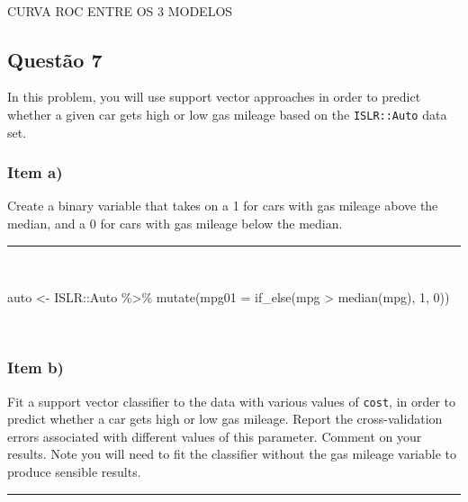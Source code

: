 \documentclass[
  a4paperpaper,
]{article}
\newenvironment{Shaded}{\begin{snugshade}}{\end{snugshade}}
\newcommand{\AttributeTok}[1]{\textcolor[rgb]{0.40,0.45,0.13}{#1}}
\newcommand{\DecValTok}[1]{\textcolor[rgb]{0.68,0.00,0.00}{#1}}
\newcommand{\FunctionTok}[1]{\textcolor[rgb]{0.28,0.35,0.67}{#1}}
\newcommand{\NormalTok}[1]{\textcolor[rgb]{0.00,0.23,0.31}{#1}}
\newcommand{\OtherTok}[1]{\textcolor[rgb]{0.00,0.23,0.31}{#1}}
\newcommand{\SpecialCharTok}[1]{\textcolor[rgb]{0.37,0.37,0.37}{#1}}
\begin{document}
~

CURVA ROC ENTRE OS 3 MODELOS

\subsection{Questão 7}\label{questuxe3o-7}

In this problem, you will use support vector approaches in order to
predict whether a given car gets high or low gas mileage based on the
\texttt{ISLR::Auto} data set.

\subsubsection{Item a)}\label{item-a-1}

Create a binary variable that takes on a 1 for cars with gas mileage
above the median, and a 0 for cars with gas mileage below the median.

\begin{center}\rule{0.5\linewidth}{0.5pt}\end{center}

~

\begin{Shaded}
\begin{Highlighting}[]
\NormalTok{auto }\OtherTok{\textless{}{-}}\NormalTok{ ISLR}\SpecialCharTok{::}\NormalTok{Auto }\SpecialCharTok{\%\textgreater{}\%}
  \FunctionTok{mutate}\NormalTok{(}\AttributeTok{mpg01 =} \FunctionTok{if\_else}\NormalTok{(mpg }\SpecialCharTok{\textgreater{}} \FunctionTok{median}\NormalTok{(mpg), }\DecValTok{1}\NormalTok{, }\DecValTok{0}\NormalTok{))}
\end{Highlighting}
\end{Shaded}

~

\subsubsection{Item b)}\label{item-b-1}

Fit a support vector classifier to the data with various values of
\texttt{cost}, in order to predict whether a car gets high or low gas
mileage. Report the cross-validation errors associated with different
values of this parameter. Comment on your results. Note you will need to
fit the classifier without the gas mileage variable to produce sensible
results.

\begin{center}\rule{0.5\linewidth}{0.5pt}\end{center}
\end{document}
